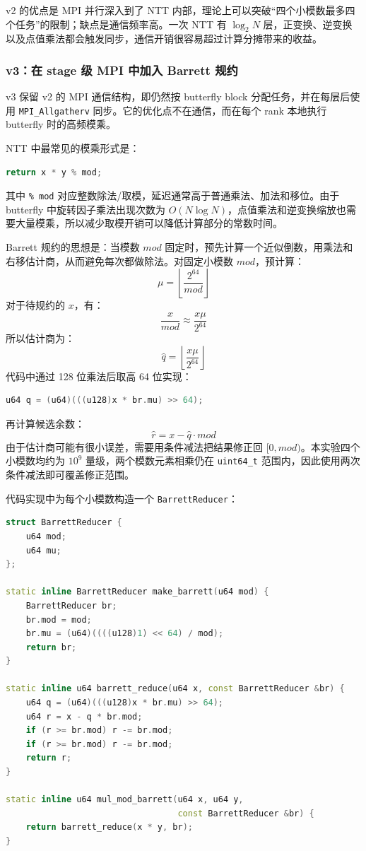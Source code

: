 \documentclass[a4paper]{article}
\begin{document}
v2 的优点是 MPI 并行深入到了 NTT 内部，理论上可以突破“四个小模数最多四个任务”的限制；缺点是通信频率高。一次 NTT 有 $\log_2 N$ 层，正变换、逆变换以及点值乘法都会触发同步，通信开销很容易超过计算分摊带来的收益。

\subsubsection{v3：在 stage 级 MPI 中加入 Barrett 规约}

v3 保留 v2 的 MPI 通信结构，即仍然按 butterfly block 分配任务，并在每层后使用 \texttt{MPI\_Allgatherv} 同步。它的优化点不在通信，而在每个 rank 本地执行 butterfly 时的高频模乘。

NTT 中最常见的模乘形式是：
\begin{lstlisting}[language=C++]
return x * y % mod;
\end{lstlisting}
其中 \texttt{\% mod} 对应整数除法/取模，延迟通常高于普通乘法、加法和移位。由于 butterfly 中旋转因子乘法出现次数为 $O(N\log N)$，点值乘法和逆变换缩放也需要大量模乘，所以减少取模开销可以降低计算部分的常数时间。

Barrett 规约的思想是：当模数 $mod$ 固定时，预先计算一个近似倒数，用乘法和右移估计商，从而避免每次都做除法。对固定小模数 $mod$，预计算：
\[
\mu=\left\lfloor\frac{2^{64}}{mod}\right\rfloor
\]
对于待规约的 $x$，有：
\[
\frac{x}{mod}\approx \frac{x\mu}{2^{64}}
\]
所以估计商为：
\[
\hat{q}=\left\lfloor\frac{x\mu}{2^{64}}\right\rfloor
\]
代码中通过 128 位乘法后取高 64 位实现：
\begin{lstlisting}[language=C++]
u64 q = (u64)(((u128)x * br.mu) >> 64);
\end{lstlisting}
再计算候选余数：
\[
\hat{r}=x-\hat{q}\cdot mod
\]
由于估计商可能有很小误差，需要用条件减法把结果修正回 $[0,mod)$。本实验四个小模数均约为 $10^9$ 量级，两个模数元素相乘仍在 \texttt{uint64\_t} 范围内，因此使用两次条件减法即可覆盖修正范围。

代码实现中为每个小模数构造一个 \texttt{BarrettReducer}：
\begin{lstlisting}[language=C++,title=Barrett 参数和规约函数]
struct BarrettReducer {
    u64 mod;
    u64 mu;
};

static inline BarrettReducer make_barrett(u64 mod) {
    BarrettReducer br;
    br.mod = mod;
    br.mu = (u64)((((u128)1) << 64) / mod);
    return br;
}

static inline u64 barrett_reduce(u64 x, const BarrettReducer &br) {
    u64 q = (u64)(((u128)x * br.mu) >> 64);
    u64 r = x - q * br.mod;
    if (r >= br.mod) r -= br.mod;
    if (r >= br.mod) r -= br.mod;
    return r;
}

static inline u64 mul_mod_barrett(u64 x, u64 y,
                                  const BarrettReducer &br) {
    return barrett_reduce(x * y, br);
}
\end{lstlisting}
\end{document}
